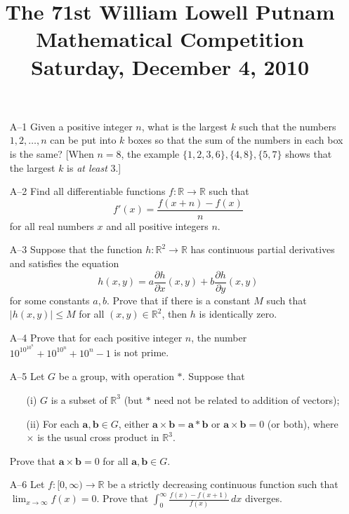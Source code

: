 \documentclass[amssymb,twocolumn,pra,10pt,aps]{revtex4-1}
\begin{document}
\title{The 71st William Lowell Putnam Mathematical Competition \\
    Saturday, December 4, 2010}
\maketitle

\begin{itemize}

\item[A--1]
Given a positive integer $n$, what is the largest $k$ such that the
numbers $1,2,\dots,n$ can be put into $k$ boxes so that the sum of the numbers
in each box is the same? [When $n=8$, the example $\{1,2,3,6\}, \{4,8\}, \{5,7\}$
shows that the largest $k$ is \emph{at least} 3.]

\item[A--2]
Find all differentiable functions $f:\mathbb{R} \to \mathbb{R}$ such that
\[
f'(x) = \frac{f(x+n)-f(x)}{n}
\]
for all real numbers $x$ and all positive integers $n$.

\item[A--3]
 Suppose that the function $h:\mathbb{R}^2\to \mathbb{R}$ has continuous partial
derivatives and satisfies the equation
\[
h(x,y) = a \frac{\partial h}{\partial x}(x,y) +
b \frac{\partial h}{\partial y}(x,y)
\]
for some constants $a,b$. Prove that if there is a constant $M$ such that
$|h(x,y)|\leq M$ for all $(x,y) \in \mathbb{R}^2$, then $h$ is identically zero.

\item[A--4]
Prove that for each positive integer $n$, the number
$10^{10^{10^n}} + 10^{10^n} + 10^n - 1$
is not prime.


\item[A--5]
Let $G$ be a group, with operation $*$. Suppose that
\begin{enumerate}
\item[(i)]
$G$ is a subset of $\mathbb{R}^3$ (but $*$ need not be related to addition of vectors);
\item[(ii)]
For each $\mathbf{a},\mathbf{b} \in G$, either $\mathbf{a}\times \mathbf{b} = \mathbf{a}*\mathbf{b}$
or $\mathbf{a}\times \mathbf{b} = 0$ (or
both), where $\times$ is the usual cross product in $\mathbb{R}^3$.
\end{enumerate}
Prove that $\mathbf{a} \times \mathbf{b} = 0$ for all $\mathbf{a}, \mathbf{b} \in G$.

\item[A--6]
Let $f:[0,\infty)\to \mathbb{R}$ be a strictly decreasing continuous function
such that $\lim_{x\to\infty} f(x) = 0$. Prove that
$\int_0^\infty \frac{f(x)-f(x+1)}{f(x)}\,dx$ diverges.


\end{itemize}
\end{document}
